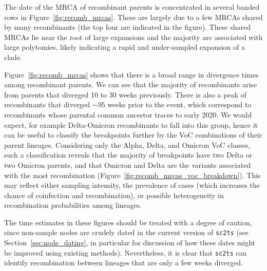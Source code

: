 \documentclass{article}
\begin{document}
The date of the MRCA of recombinant parents is
concentrated in several banded rows in Figure~\ref{fig:recomb_mrcas}. These are
largely due to a few MRCAs shared by many
recombinants (the top four are indicated in the figure).
These shared MRCAs lie near the root of large expansions
and the majority are associated with large polytomies, likely
indicating a rapid and under-sampled expansion of a clade.

Figure~\ref{fig:recomb_mrcas} shows that there is a
broad range in divergence times among recombinant parents.
We can see that the majority of recombinants arise
from parents that diverged 10 to 30 weeks
previously. There is also a peak of recombinants that diverged
${\sim}95$ weeks prior to the event, which correspond to recombinants whose
parental common ancestor traces to early 2020. We would expect, for example
Delta-Omicron recombinants to fall into this group, hence it can be
useful to classify the breakpoints further by the VoC combinations of their
parent lineages. Considering only the Alpha, Delta, and Omicron VoC classes,
such a classification reveals that the majority of breakpoints have two Delta or
two Omicron parents, and that Omicron and Delta are the variants associated
with the most recombination (Figure~\ref{fig:recomb_mrcas_voc_breakdown}).
This may reflect either sampling intensity, the
prevalence of cases (which increases the
chance of coinfection and recombination), or possible heterogeneity in
recombination probabilities among lineages.

The time estimates in these figures should be
treated with a degree of caution,
since non-sample nodes are crudely dated in the current version
of \texttt{sc2ts} (see Section~\ref{sec:node_dating}, in particular
for discussion of how these dates might be improved using existing
methods).
Nevertheless, it is clear
that \texttt{sc2ts} can identify recombination between lineages
that are only a few weeks diverged.
\end{document}
